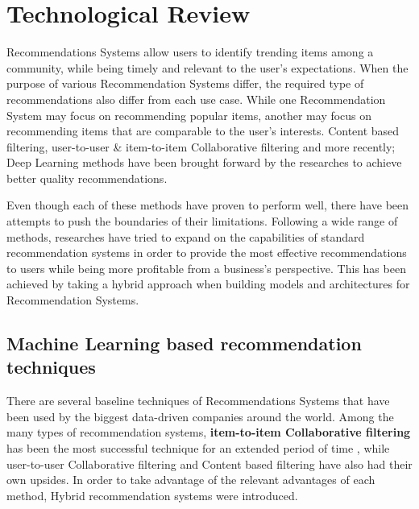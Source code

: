 


\section{Technological Review}

Recommendations Systems allow users to identify trending items among a community, while being timely and relevant to the user's expectations. When the purpose of various Recommendation Systems differ, the required type of recommendations also differ from each use case. While one Recommendation System may focus on recommending popular items, another may focus on recommending items that are comparable to the user's interests. Content based filtering, user-to-user \& item-to-item Collaborative filtering and more recently; Deep Learning methods have been brought forward by the researches to achieve better quality recommendations.

Even though each of these methods have proven to perform well, there have been attempts to push the boundaries of their limitations. Following a wide range of methods, researches have tried to expand on the capabilities of standard recommendation systems in order to provide the most effective recommendations to users while being more profitable from a business's perspective. This has been achieved by taking a hybrid approach when building models and architectures for Recommendation Systems.

\subsection{Machine Learning based recommendation techniques}
There are several baseline techniques of Recommendations Systems that have been used by the biggest data-driven companies around the world.
Among the many types of recommendation systems, \textbf{item-to-item Collaborative filtering} \autocite{linden_amazoncom_2003} has been the most successful technique for an extended period of time \autocite{smith_two_2017}, while user-to-user Collaborative filtering and Content based filtering have also had their own upsides. In order to take advantage of the relevant advantages of each method, Hybrid recommendation systems \autocite{geetha_hybrid_2018} were introduced. 

